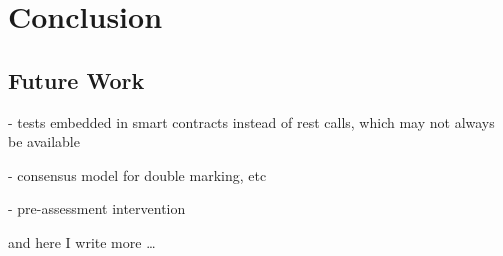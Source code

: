 \chapter{Conclusion}

\section{Future Work}

- tests embedded in smart contracts instead of rest calls, which may not always be available

- consensus model for double marking, etc

- pre-assessment intervention \citep{bryan2006innovative}

and here I write more \dots
